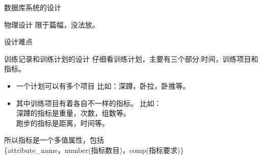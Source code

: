 \documentclass{beamer}
\begin{document}
\begin{frame}{数据库系统的设计}
{    
  }

   {
    物理设计
    限于篇幅，没法放。
  }






    
\end{frame}

\begin{frame}{设计难点}

   {
    \begin{block}{训练记录和训练计划的设计}
      仔细看训练计划，主要有三个部分:时间，训练项目和指标。

      \begin{itemize}
      \item 一个计划可以有多个项目
        比如：深蹲，卧拉，卧推等。

      \item 其中训练项目有着各自不一样的指标。
        比如：\\
        深蹲的指标是重量，次数，组数等。\\
        跑步的指标是距离，时间等。
      \end{itemize}
    \end{block}
    
    所以指标是一个多值属性，包括\\
    \{attribute\_name，number(指标数目)，comp(指标要求)\}
  }
  
\end{frame}
\end{document}
